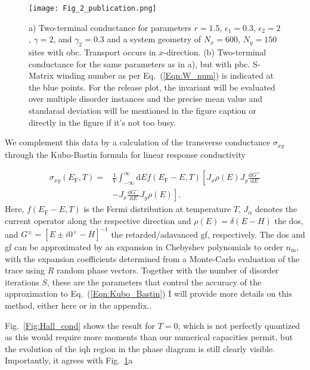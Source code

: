 \documentclass[aps,prl,amsmath,amssymb,twocolumn]{revtex4-2}
\newcommand{\BM}[1]{{\color{orange} #1}}
\newcommand{\eq}[1]{Eq.~(\ref{#1})}
\begin{document}
\begin{figure}[htp!]	 
{\texttt{[image: Fig\_2\_publication.png]}}
\caption{a) Two-terminal conductance for parameters $r = 1.5$, $\epsilon_1 = 0.3$, $\epsilon_2 = 2$, $\gamma  =2$, and $\gamma_2 = 0.3$ and a system geometry of $N_x = 600$, $N_y = 150$ sites with \gls{obc}. Transport occurs in $x$-direction. (b) Two-terminal conductance for the same parameters as in a), but with \gls{pbc}. S-Matrix winding number as per \eq{Eqn:W_num} is indicated at the blue points. \BM{For the release plot, the invariant will be evaluated over multiple disorder instances and the precise mean value and standarad deviation will be mentioned in the figure caption or directly in the figure if it's not too busy.}}\label{Fig:Transport}
\end{figure}
We complement this data by a calculation of the transverse conductance $\sigma_{xy}$ through the Kubo-Bastin formula for linear response conductivity 

\begin{align}
\sigma_{xy}(E_\mathrm{F}, T) =& \frac{1}{V} \int_{-\infty}^\infty \mathrm{d} E f(E_\mathrm{F} - E, T) \left[{J}_x \rho(E) {J}_y \frac{\mathrm{d} G^+}{\mathrm{d} E} \right. \nonumber \\
& - \left. J_x \frac{\mathrm{d} G^-}{\mathrm{d} E} { J}_y  \rho(E)  \right].\label{Eqn:Kubo_Bastin}
\end{align}
Here, $f(E_\mathrm{F} - E, T)$ is the Fermi distribution at temperature $T$, ${J}_\alpha$ denotes the current operator along the respective direction and $\rho(E) = \delta(E - H)$ the \gls{dos}, and $G^{\pm} = [E \pm i 0^+ - H]^{-1}$ the retarded/adavanced \gls{gf}, respectively. The \gls{dos} and \gls{gf} can be approximated by an expansion in Chebyshev polynomials to order $n_\mathrm{m}$, with the expansion coefficients determined from a Monte-Carlo evaluation of the trace using $R$ random phase vectors. Together with the number of disorder iterations $S$, these are the parameters that control the accuracy of the approximation to \eq{Eqn:Kubo_Bastin} \BM{I will provide more details on this method, either here or in the appendix.}.

Fig.~\ref{Fig:Hall_cond} shows the result for $T = 0$, which is not perfectly quantized as this would require more moments than our numerical capacities permit, but the evolution of the \gls{iqh} region in the phase diagram is still clearly visible. Importantly, it agrees with Fig.~\ref{Fig:Transport}a
\end{document}
